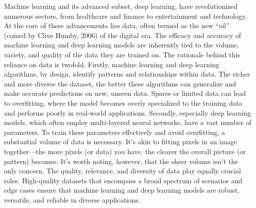 \documentclass[
  10pt,
]{scrbook}
\begin{document}
Machine learning and its advanced subset, deep learning, have
revolutionized numerous sectors, from healthcare and finance to
entertainment and technology. At the core of these advancements lies
data, often termed as the new ``oil'' (coined by Clive Humby, 2006) of
the digital era. The efficacy and accuracy of machine learning and deep
learning models are inherently tied to the volume, variety, and quality
of the data they are trained on. The rationale behind this reliance on
data is twofold. Firstly, machine learning and deep learning algorithms,
by design, identify patterns and relationships within data. The richer
and more diverse the dataset, the better these algorithms can generalize
and make accurate predictions on new, unseen data. Sparse or limited
data can lead to overfitting, where the model becomes overly specialized
to the training data and performs poorly in real-world applications.
Secondly, especially deep learning models, which often employ
multi-layered neural networks, have a vast number of parameters. To
train these parameters effectively and avoid overfitting, a substantial
volume of data is necessary. It's akin to fitting pixels in an image
together---the more pixels (or data) you have, the clearer the overall
picture (or pattern) becomes. It's worth noting, however, that the sheer
volume isn't the only concern. The quality, relevance, and diversity of
data play equally crucial roles. High-quality datasets that encompass a
broad spectrum of scenarios and edge cases ensure that machine learning
and deep learning models are robust, versatile, and reliable in diverse
applications.
\end{document}
